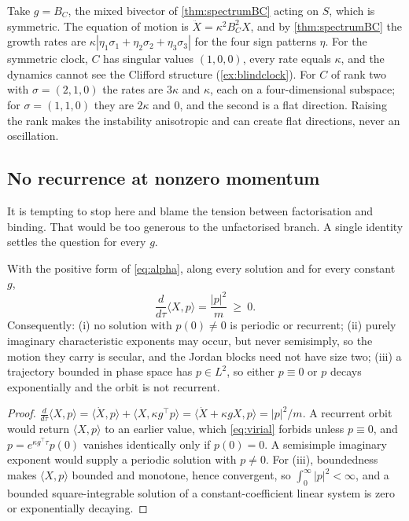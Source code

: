 \begin{example}
\label{ex:convshift}
Take $g=B_C$, the mixed bivector of \cref{thm:spectrumBC} acting on $S$, which is symmetric. The equation of motion is $\ddot X=\kappa^2B_C^2X$, and
by \cref{thm:spectrumBC} the growth rates are $\kappa|\eta_1\sigma_1+\eta_2\sigma_2+\eta_3\sigma_3|$ for the four sign patterns $\eta$. For the
symmetric clock, $C$ has singular values $(1,0,0)$, every rate equals $\kappa$, and the dynamics cannot see the Clifford structure
(\cref{ex:blindclock}). For $C$ of rank two with $\sigma=(2,1,0)$ the rates are $3\kappa$ and $\kappa$, each on a four-dimensional subspace; for
$\sigma=(1,1,0)$ they are $2\kappa$ and $0$, and the second is a flat direction. Raising the rank makes the instability anisotropic and can
create flat directions, never an oscillation.
\end{example}

\subsection{No recurrence at nonzero momentum}

It is tempting to stop here and blame the tension between factorisation and binding. That would be too generous to the unfactorised
branch. A single identity settles the question for every $g$.

\begin{theorem}
\label{thm:virial}
With the positive form of \eqref{eq:alpha}, along every solution and for every constant $g$,
\begin{equation}
\label{eq:virial}
\frac{d}{d\tau}\langle X,p\rangle=\frac{|p|^2}{m}\ \ge\ 0 .
\end{equation}
Consequently: (i) no solution with $p(0)\neq0$ is periodic or recurrent; (ii) purely imaginary characteristic exponents may occur, but never
semisimply, so the motion they carry is secular, and the Jordan blocks need not have size two; (iii) a trajectory bounded in phase space has
$p\in L^2$, so either $p\equiv0$ or $p$ decays exponentially and the orbit is not recurrent.
\end{theorem}

\begin{proof}
$\tfrac{d}{d\tau}\langle X,p\rangle=\langle\dot X,p\rangle+\langle X,\kappa g^{\!\top}p\rangle=\langle\dot X+\kappa gX,p\rangle=|p|^2/m$. A recurrent orbit would
return $\langle X,p\rangle$ to an earlier value, which \eqref{eq:virial} forbids unless $p\equiv0$, and $p=e^{\kappa g^{\!\top}\tau}p(0)$ vanishes
identically only if $p(0)=0$. A semisimple imaginary exponent would supply a periodic solution with $p\neq0$. For (iii), boundedness makes
$\langle X,p\rangle$ bounded and monotone, hence convergent, so $\int_0^\infty|p|^2<\infty$, and a bounded square-integrable solution of a
constant-coefficient linear system is zero or exponentially decaying.
\end{proof}

